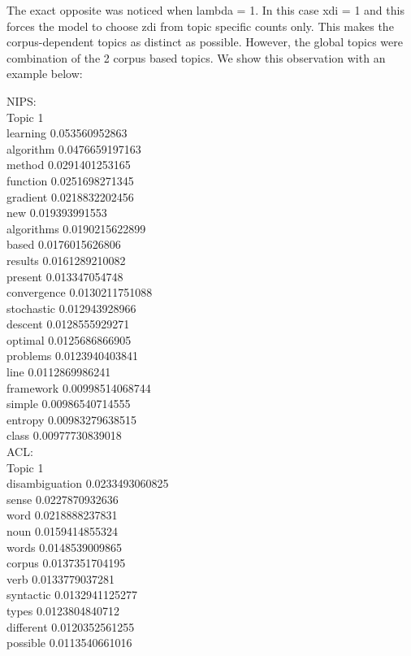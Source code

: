 \documentclass{article}
\begin{document}
The exact opposite was noticed when lambda = 1. In this case xdi = 1 and this forces the model to choose zdi from topic specific counts only. This makes the corpus-dependent topics as distinct as possible. However, the global topics were combination of the 2 corpus based topics. We show this observation with an example below:

NIPS:\\
Topic 1\\
learning 0.053560952863\\
algorithm 0.0476659197163\\
method 0.0291401253165\\
function 0.0251698271345\\
gradient 0.0218832202456\\
new 0.019393991553\\
algorithms 0.0190215622899\\
based 0.0176015626806\\
results 0.0161289210082\\
present 0.013347054748\\
convergence 0.0130211751088\\
stochastic 0.012943928966\\
descent 0.0128555929271\\
optimal 0.0125686866905\\
problems 0.0123940403841\\
line 0.0112869986241\\
framework 0.00998514068744\\
simple 0.00986540714555\\
entropy 0.00983279638515\\
class 0.00977730839018\\
ACL:\\
Topic 1\\
disambiguation 0.0233493060825\\
sense 0.0227870932636\\
word 0.0218888237831\\
noun 0.0159414855324\\
words 0.0148539009865\\
corpus 0.0137351704195\\
verb 0.0133779037281\\
syntactic 0.0132941125277\\
types 0.0123804840712\\
different 0.0120352561255\\
possible 0.0113540661016\\
\end{document}
